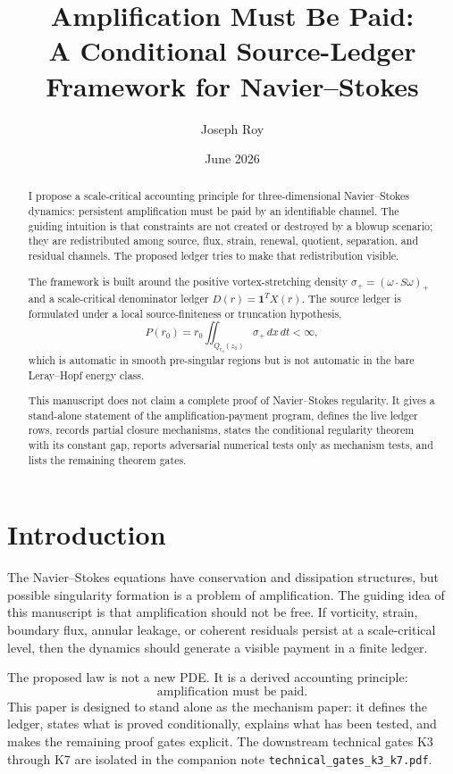 \documentclass[11pt]{article}
\title{Amplification Must Be Paid:\\
A Conditional Source-Ledger Framework for Navier--Stokes}
\author{Joseph Roy}
\date{June 2026}
\begin{document}
\maketitle

\begin{abstract}
I propose a scale-critical accounting principle for three-dimensional
Navier--Stokes dynamics: persistent amplification must be paid by an
identifiable channel.  The guiding intuition is that constraints are not
created or destroyed by a blowup scenario; they are redistributed among
source, flux, strain, renewal, quotient, separation, and residual channels.
The proposed ledger tries to make that redistribution visible.

The framework is built around the positive vortex-stretching density
\(\sigma_+=(\omega\cdot S\omega)_+\) and a scale-critical denominator ledger
\(D(r)=\mathbf 1^T X(r)\).  The source ledger is formulated under a local
source-finiteness or truncation hypothesis,
\[
P(r_0)=r_0\iint_{Q_{r_0}(z_0)}\sigma_+\,dx\,dt<\infty,
\]
which is automatic in smooth pre-singular regions but is not automatic in the
bare Leray--Hopf energy class.

This manuscript does not claim a complete proof of Navier--Stokes regularity.
It gives a stand-alone statement of the amplification-payment program, defines
the live ledger rows, records partial closure mechanisms, states the conditional
regularity theorem with its constant gap, reports adversarial numerical tests
only as mechanism tests, and lists the remaining theorem gates.
\end{abstract}

\clearpage
\section{Introduction}
\label{sec:introduction}

The Navier--Stokes equations have conservation and dissipation structures, but
possible singularity formation is a problem of amplification.  The guiding idea
of this manuscript is that amplification should not be free.  If vorticity,
strain, boundary flux, annular leakage, or coherent residuals persist at a
scale-critical level, then the dynamics should generate a visible payment in a
finite ledger.

The proposed law is not a new PDE.  It is a derived accounting principle:
\[
\boxed{\text{amplification must be paid}.}
\]
This paper is designed to stand alone as the mechanism paper: it defines the
ledger, states what is proved conditionally, explains what has been tested, and
makes the remaining proof gates explicit.  The downstream technical gates K3
through K7 are isolated in the companion note
\texttt{technical\_gates\_k3\_k7.pdf}.
\end{document}
